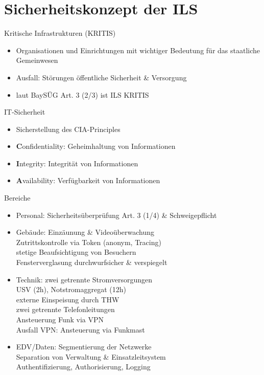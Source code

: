 \section{Sicherheitskonzept der ILS}
\begin{warningbox}{Kritische Infrastrukturen (KRITIS)}
   \begin{itemize}
        \item Organisationen und Einrichtungen mit wichtiger Bedeutung für das staatliche Gemeinwesen
        \item Ausfall: Störungen öffentliche Sicherheit \& Versorgung
        \item laut BaySÜG Art. 3 (2/3) ist ILS KRITIS
   \end{itemize}
\end{warningbox}
\begin{sectionbox}{IT-Sicherheit}
    \begin{itemize}
        \item Sicherstellung des CIA-Principles
        \item \textbf{C}onfidentiality: Geheimhaltung von Informationen
        \item \textbf{I}ntegrity: Integrität von Informationen
        \item \textbf{A}vailability: Verfügbarkeit von Informationen
    \end{itemize}
\end{sectionbox}
\begin{sectionbox}{Bereiche}
    \begin{itemize}
        \item Personal: Sicherheitsüberprüfung Art. 3 (1/4) \& Schweigepflicht
        \item Gebäude: Einzäunung \& Videoüberwachung\\ 
        \ra Zutrittskontrolle via Token (anonym, Tracing)\\
        \ra stetige Beaufsichtigung von Besuchern\\
        \ra Fensterverglasung durchwurfsicher \& verspiegelt
        \item Technik: zwei getrennte Stromversorgungen\\
        \ra USV (2h), Notstromaggregat (12h)\\
        \ra externe Einspeisung durch THW\\
        \ra zwei getrennte Telefonleitungen\\
        \ra Ansteuerung Funk via VPN\\
        \ra Ausfall VPN: Ansteuerung via Funkmast
        \item EDV/Daten: Segmentierung der Netzwerke\\
        \ra Separation von Verwaltung \& Einsatzleitsystem\\
        \ra Authentifizierung, Authorisierung, Logging
    \end{itemize}
\end{sectionbox}